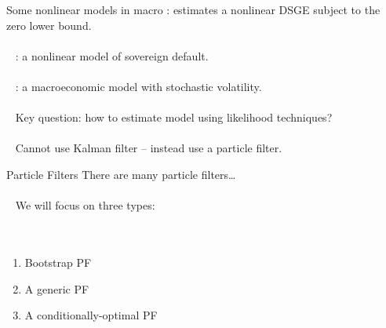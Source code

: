 \documentclass[presentation]{beamer}
\begin{document}
\begin{frame}[label={sec:orga4df356}]{Some nonlinear models in macro}
\cite{Gust_2017}: estimates a nonlinear DSGE subject to the zero lower bound. 
\\~\\~  
\cite{Bocola_2016}: a nonlinear model of sovereign default. 
\\~\\~  
\cite{Fern_ndez_Villaverde_2009}: a macroeconomic model with stochastic volatility. 
\\~\\~  
Key question: how to estimate model using likelihood techniques?
\\~\\~  
Cannot use Kalman filter -- instead use a \alert{particle filter}.
\end{frame}


\begin{frame}[label={sec:org48eb97a}]{Particle Filters}
There are many particle filters\ldots{}
\\~\\~  
We will focus on three types:
\\~\\~  
\begin{enumerate}
\item Bootstrap PF
\item A generic PF
\item A conditionally-optimal PF
\end{enumerate}
\end{frame}
\end{document}
